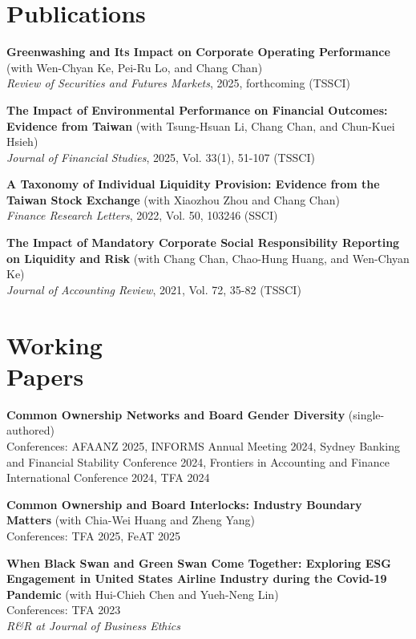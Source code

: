 \documentclass[margin]{res} %
\begin{document}
\begin{resume}
\section{Publications}

\textbf{Greenwashing and Its Impact on Corporate Operating Performance} (with Wen-Chyan Ke, Pei-Ru Lo, and Chang Chan) \\
\textit{Review of Securities and Futures Markets}, 2025, forthcoming (TSSCI)

\textbf{The Impact of Environmental Performance on Financial Outcomes: Evidence from Taiwan} (with Tsung-Hsuan Li, Chang Chan, and Chun-Kuei Hsieh) \\
\textit{Journal of Financial Studies}, 2025, Vol. 33(1), 51-107 (TSSCI)

\textbf{A Taxonomy of Individual Liquidity Provision: Evidence from the Taiwan Stock Exchange} (with Xiaozhou Zhou and Chang Chan) \\
\textit{Finance Research Letters}, 2022, Vol. 50, 103246 (SSCI)

\textbf{The Impact of Mandatory Corporate Social Responsibility Reporting on Liquidity and Risk} (with Chang Chan, Chao-Hung Huang, and Wen-Chyan Ke) \\
\textit{Journal of Accounting Review}, 2021, Vol. 72, 35-82 (TSSCI)


\section{Working \\ Papers}

\textbf{Common Ownership Networks and Board Gender Diversity} (single-authored) \\
Conferences: AFAANZ 2025, INFORMS Annual Meeting 2024, Sydney Banking and Financial Stability Conference 2024, Frontiers in Accounting and Finance International Conference 2024, TFA 2024

\textbf{Common Ownership and Board Interlocks: Industry Boundary Matters} (with Chia-Wei Huang and Zheng Yang) \\
Conferences: TFA 2025, FeAT 2025

\textbf{When Black Swan and Green Swan Come Together: Exploring ESG Engagement in United States Airline Industry during the Covid-19 Pandemic} (with Hui-Chieh Chen and Yueh-Neng Lin) \\
Conferences: TFA 2023 \\
\textit{R\&R at Journal of Business Ethics}


\end{resume}
\end{document}
